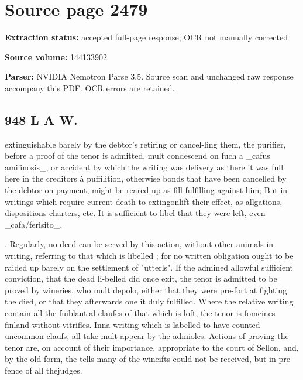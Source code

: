 \clearpage
\section{Source page 2479}
\textbf{Extraction status:} accepted full-page response; OCR not manually corrected\par
\textbf{Source volume:} 144133902\par
\textbf{Parser:} NVIDIA Nemotron Parse 3.5. Source scan and unchanged raw response accompany this PDF. OCR errors are retained.\par\medskip
\subsection*{948 L A W.}
extinguishable barely by the debtor’s retiring or cancel-ling them, the purifier, before a proof of the tenor is admitted, mult condescend on fuch a \_cafus amifinosis\_, or accident by which the writing was delivery as there it was full here in the creditors à puffilition, otherwise bonds that have been cancelled by the debtor on payment, might be reared up as fill fulfilling against him; But in writings which require current death to extingonlift their effect, as allgations, dispositions charters, etc. It is sufficient to libel that they were left, even \_cafa/ferisito\_.\par{}. Regularly, no deed can be served by this action, without other animals in writing, referring to that which is libelled ; for no written obligation ought to be raided up barely on the settlement of "utterls". If the admined allowful sufficient conviction, that the dead li-belled did once exit, the tenor is admitted to be proved by wineries, who mult depolo, either that they were pre-fort at fighting the died, or that they afterwards one it duly fulfilled. Where the relative writing contain all the fuiblantial claufes of that which is loft, the tenor is fomeines finland without vitrifles. Inna writing which is labelled to have counted uncommon claufs, all take mult appear by the admioles. Actions of proving the tenor are, on account of their importance, appropriate to the court of Sellon, and, by the old form, the tells many of the wineifts could not be received, but in pre- fence of all thejudges.\par\medskip
